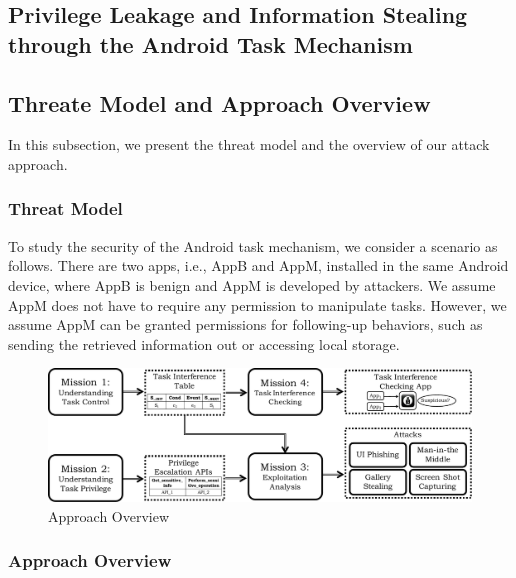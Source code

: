 \documentclass[letterpaper,12pt]{article}
\begin{document}
   \newpage
   \begin{singlespace}
   \section{Privilege Leakage and Information Stealing through the Android Task Mechanism}
   \end{singlespace}
    \label{sec:atmtitle}




\subsection{Threate Model and Approach Overview} \label{sec:threatandapproach}

In this subsection, we present the threat model and the overview of our attack approach.

\subsubsection{Threat Model} \label{subsec:threat}

To study the security of the Android task mechanism, we consider a
scenario as follows. There are two apps, i.e., AppB and AppM,
installed in the same Android device, where AppB is benign and AppM is
developed by attackers.  We assume AppM does not have to require any
permission to manipulate tasks. However, we assume AppM can be granted
permissions for following-up behaviors, such as sending the retrieved
information out or accessing local storage.

\begin{figure}[t]
        \centering
        \includegraphics[width=1\linewidth]{overall.pdf}
        \caption{Approach Overview}
        \label{fig:arch}
\end{figure}

\subsubsection{Approach Overview} \label{sec:approachoverview}
\end{document}
